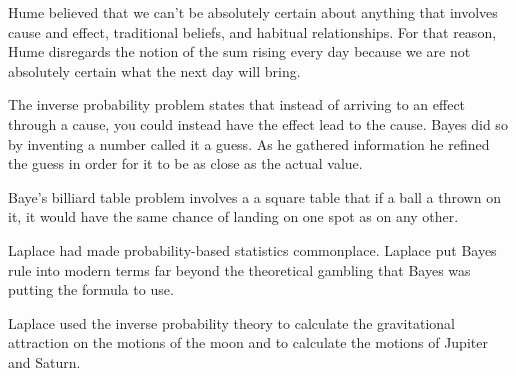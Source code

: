 \documentclass[12pt]{article}
\begin{document}

\begin{enumerate}


Hume believed that we can't be absolutely certain about anything that involves cause and effect, traditional beliefs, and habitual relationships. For that reason, Hume disregards the notion of the sum rising every day because we are not absolutely certain what the next day will bring. 

The inverse probability problem states that instead of arriving to an effect through a cause, you could instead have the effect lead to the cause. Bayes did so by inventing a number called it a guess. As he gathered information he refined the guess in order for it to be as close as the actual value. 


Baye's billiard table problem involves a a square table that if a ball a thrown on it, it would have the same chance of landing on one spot as on any other. 

 


Laplace had made probability-based statistics commonplace. Laplace put Bayes rule into modern terms far beyond the theoretical gambling that Bayes was putting the formula to use. 



Laplace used the inverse probability theory to calculate the gravitational attraction on the motions of the moon and to calculate the motions of Jupiter and Saturn. 

 




\end{enumerate}
\end{document}
